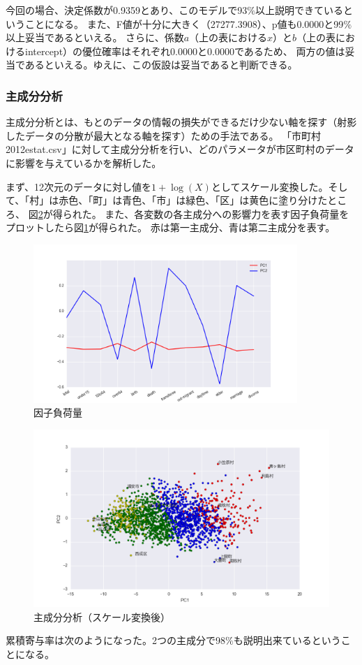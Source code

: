 \documentclass[a4paper,xelatex,ja=standard,jafont=hiragino-pron, 10pt]{bxjsarticle}
\begin{document}
今回の場合、決定係数が0.9359とあり、このモデルで93$\%$以上説明できているということになる。
また、F値が十分に大きく（27277.3908）、p値も0.0000と99$\%$以上妥当であるといえる。
さらに、係数$a$（上の表における$x$）と$b$（上の表におけるintercept）の優位確率はそれぞれ0.0000と0.0000であるため、
両方の値は妥当であるといえる。ゆえに、この仮設は妥当であると判断できる。

\subsubsection{主成分分析}

主成分分析とは、もとのデータの情報の損失ができるだけ少ない軸を探す（射影したデータの分散が最大となる軸を探す）ための手法である。
「市町村 2012estat.csv」に対して主成分分析を行い、どのパラメータが市区町村のデータに影響を与えているかを解析した。

まず、12次元のデータに対し値を$1+\log(X)$としてスケール変換した。そして、「村」は赤色、「町」は青色、「市」は緑色、「区」は黄色に塗り分けたところ、
図\ref{pca}が得られた。
また、各変数の各主成分への影響⼒を表す因子負荷量をプロットしたら図\ref{pca_model}が得られた。
赤は第一主成分、青は第二主成分を表す。

\begin{figure}[ht]
  \centering
  \includegraphics[clip, width=10cm]{../data/picture/factor_components.png}
  \caption{因子負荷量}
  \label{pca_model}
\end{figure}

\begin{figure}[ht]
  \centering
  \includegraphics[clip, width=15cm]{../data/picture/factor_log.png}
  \caption{主成分分析（スケール変換後）}
  \label{pca}
\end{figure}
\newpage
累積寄与率は次のようになった。2つの主成分で98$\%$も説明出来ているということになる。
\end{document}
